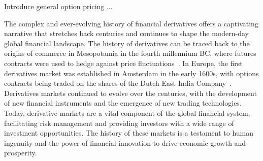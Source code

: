 Introduce general option pricing ...



The complex and ever-evolving history of financial derivatives offers a captivating narrative that stretches back centuries and continues to shape the modern-day global financial landscape. The history of derivatives can be traced back to the origins of commerce in Mesopotamia in the fourth millennium BC, where futures contracts were used to hedge against price fluctuations~\cite{Weber2009AMarkets}. In Europe, the first derivatives market was established in Amsterdam in the early 1600s, with options contracts being traded on the shares of the Dutch East India Company~\cite{Petram2011The1602-1700}. Derivatives markets continued to evolve over the centuries, with the development of new financial instruments and the emergence of new trading technologies. Today, derivative markets are a vital component of the global financial system, facilitating risk management and providing investors with a wide range of investment opportunities. The history of these markets is a testament to human ingenuity and the power of financial innovation to drive economic growth and prosperity. 

